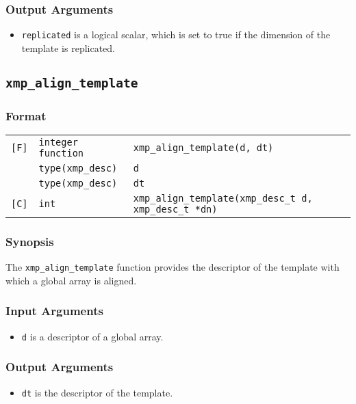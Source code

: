 \subsubsection*{Output Arguments}
\begin{itemize}
 \item {\tt replicated} is a logical scalar, which is set to true if the
       dimension of the template is replicated.

\end{itemize}


\subsection{\tt xmp\_align\_template}

\subsubsection*{Format}

\begin{tabular}{lll}

\verb![F]!& {\tt integer function}& {\tt xmp\_align\_template(d, dt)}\\
          & {\tt type(xmp\_desc)} & {\tt d}\\
          & {\tt type(xmp\_desc)} & {\tt dt}\\

\verb![C]!&  {\tt int}& {\tt xmp\_align\_template(xmp\_desc\_t d, xmp\_desc\_t *dn)}\\

\end{tabular}

\subsubsection*{Synopsis}

The {\tt xmp\_align\_template} function provides the descriptor of the
template with which a global array is aligned.


\subsubsection*{Input Arguments}
\begin{itemize}
 \item {\tt d} is a descriptor of a global array.
\end{itemize}

\subsubsection*{Output Arguments}
\begin{itemize}
 \item {\tt dt} is the descriptor of the template.
\end{itemize}


